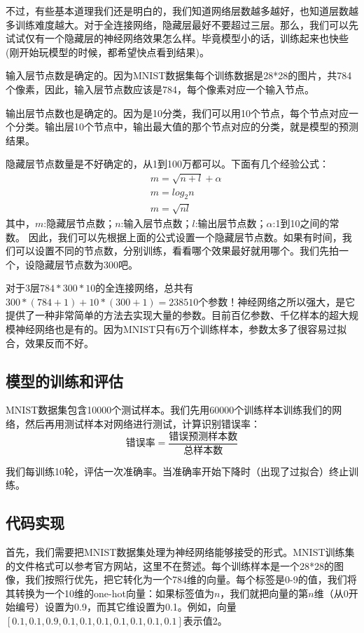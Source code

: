 不过，有些基本道理我们还是明白的，我们知道网络层数越多越好，也知道层数越多训练难度越大。对于全连接网络，隐藏层最好不要超过三层。那么，我们可以先试试仅有一个隐藏层的神经网络效果怎么样。毕竟模型小的话，训练起来也快些(刚开始玩模型的时候，都希望快点看到结果)。

输入层节点数是确定的。因为MNIST数据集每个训练数据是28*28的图片，共784个像素，因此，输入层节点数应该是784，每个像素对应一个输入节点。

输出层节点数也是确定的。因为是10分类，我们可以用10个节点，每个节点对应一个分类。输出层10个节点中，输出最大值的那个节点对应的分类，就是模型的预测结果。

隐藏层节点数量是不好确定的，从1到100万都可以。下面有几个经验公式：
\begin{align*}
	 & m=\sqrt{n+l}+\alpha \\
	 & m=log_2n            \\
	 & m=\sqrt{nl}
\end{align*}
其中，$m$:隐藏层节点数；$n$:输入层节点数；$l$:输出层节点数；$\alpha$:1到10之间的常数。
因此，我们可以先根据上面的公式设置一个隐藏层节点数。如果有时间，我们可以设置不同的节点数，分别训练，看看哪个效果最好就用哪个。我们先拍一个，设隐藏层节点数为300吧。

对于3层\(784*300*10\)的全连接网络，总共有\(300*(784+1)+10*(300+1)=238510\)个参数！神经网络之所以强大，是它提供了一种非常简单的方法去实现大量的参数。目前百亿参数、千亿样本的超大规模神经网络也是有的。因为MNIST只有6万个训练样本，参数太多了很容易过拟合，效果反而不好。

\subsection{模型的训练和评估}\label{Bp:11}

MNIST数据集包含10000个测试样本。我们先用60000个训练样本训练我们的网络，然后再用测试样本对网络进行测试，计算识别错误率：
\[
	\mbox{错误率}=\frac{\mbox{错误预测样本数}}{\mbox{总样本数}}
\]

我们每训练10轮，评估一次准确率。当准确率开始下降时（出现了过拟合）终止训练。


\subsection{代码实现}\label{Bp:12}

首先，我们需要把MNIST数据集处理为神经网络能够接受的形式。MNIST训练集的文件格式可以参考官方网站，这里不在赘述。每个训练样本是一个28*28的图像，我们按照行优先，把它转化为一个784维的向量。每个标签是0-9的值，我们将其转换为一个10维的one-hot向量：如果标签值为\(n\)，我们就把向量的第\(n\)维（从0开始编号）设置为0.9，而其它维设置为0.1。例如，向量$[0.1,0.1,0.9,0.1,0.1,0.1,0.1,0.1,0.1,0.1]$表示值2。


